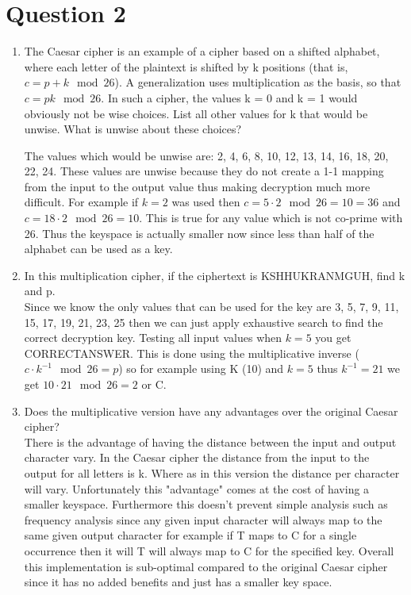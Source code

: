 \documentclass[fleqn, 12pt]{article}
\begin{document}
\section*{Question 2}

\begin{enumerate}
    \item
        The Caesar cipher is an example of a cipher based on a shifted alphabet, where each letter of the plaintext is shifted by k positions (that is, $c = p + k \mod 26$). A generalization uses multiplication as the basis, so that $c = pk \mod 26$. In such a cipher, the values k = 0 and k = 1 would obviously not be wise choices. List all other values for k that would be unwise. What is unwise about these choices? 
        
        The values which would be unwise are: 2, 4, 6, 8, 10, 12, 13, 14, 16, 18, 20, 22, 24. These values are unwise because they do not create a 1-1 mapping from the input to the output value thus making decryption much more difficult. For example if $k=2$ was used then $c=5 \cdot 2 \mod 26 = 10 = 36$ and $c = 18 \cdot 2 \mod 26 = 10$. This is true for any value which is not co-prime with 26. Thus the keyspace is actually smaller now since less than half of the alphabet can be used as a key.
        
    \item
        In this multiplication cipher, if the ciphertext is KSHHUKRANMGUH, find k and p.\\
        
        Since we know the only values that can be used for the key are 3, 5, 7, 9, 11, 15, 17, 19, 21, 23, 25 then we can just apply exhaustive search to find the correct decryption key. Testing all input values when $k=5$ you get CORRECTANSWER. This is done using the multiplicative inverse ($c \cdot k^{-1} \mod 26 = p$) so for example using K (10) and $k=5$ thus $k^{-1}=21$ we get $10 \cdot 21 \mod 26 = 2$ or C.
        
        
    \item
        Does the multiplicative version have any advantages over the original Caesar cipher?\\
        
        There is the advantage of having the distance between the input and output character vary. In the Caesar cipher the distance from the input to the output for all letters is k. Where as in this version the distance per character will vary. Unfortunately this "advantage" comes at the cost of having a smaller keyspace. Furthermore this doesn't prevent simple analysis such as frequency analysis since any given input character will always map to the same given output character for example if T maps to C for a single occurrence then it will T will always map to C for the specified key. Overall this implementation is sub-optimal compared to the original Caesar cipher since it has no added benefits and just has a smaller key space.
\end{enumerate}
\end{document}
